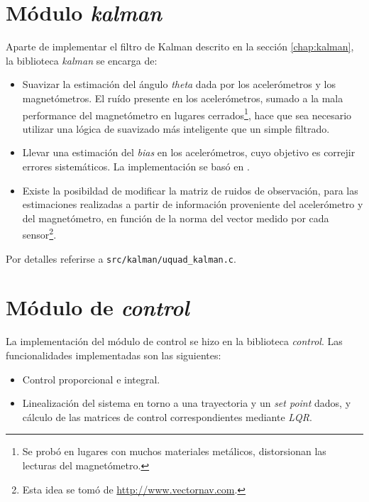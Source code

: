 \documentclass[main]{subfiles}
\begin{document}
\section{M\'odulo \textit{kalman}}
\label{sec:software:kalman}

Aparte de implementar el filtro de Kalman descrito en la secci\'on \ref{chap:kalman}, la biblioteca \textit{kalman} se encarga de:


\begin{itemize}
\item Suavizar la estimaci\'on del \'angulo \textit{theta} dada por los aceler\'ometros y los magnet\'ometros. El ru\'ido presente en los aceler\'ometros, sumado a la mala performance del magnet\'ometro en lugares cerrados\footnote{Se prob\'o en lugares con muchos materiales met\'alicos, distorsionan las lecturas del magnet\'ometro.}, hace que sea necesario utilizar una l\'ogica de suavizado m\'as inteligente que un simple filtrado.
\item Llevar una estimaci\'on del \textit{bias} en los aceler\'ometros, cuyo objetivo es correjir errores sistem\'aticos. La implementaci\'on se bas\'o en \cite{}.
\item Existe la posibildad de modificar la matriz de ruidos de observaci\'on, para las estimaciones realizadas a partir de informaci\'on proveniente del aceler\'ometro y del magnet\'ometro, en funci\'on de la norma del vector medido por cada sensor\footnote{Esta idea se tom\'o de \url{http://www.vectornav.com}.}.
\end{itemize}

Por detalles referirse a \verb+src/kalman/uquad_kalman.c+.

\section{M\'odulo de \textit{control}}
\label{sec:software:control}

La implementación del módulo de control se hizo en la biblioteca \textit{control}. Las funcionalidades implementadas son las siguientes:

\begin{itemize}
\item Control proporcional e integral.
\item Linealización del sistema en torno a una trayectoria y un \textit{set point} dados, y c\'alculo de las matrices de control correspondientes mediante \textit{LQR}.
\end{itemize}
\end{document}
